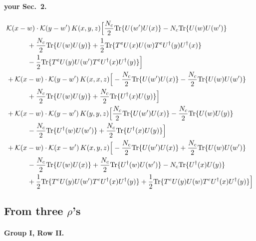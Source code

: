 \documentclass[10pt]{article}
\numberwithin{equation}{section}
\begin{document}
\paragraph{your Sec.~2.}

\begin{align}
&\mathcal K(x-w)\cdot\mathcal K(y-w')\,K(x,y,z)\Big[\frac{N_c}{2}{\rm Tr}\{U(w')U(x)\}-N_c{\rm Tr}\{U(w)U(w')\}\notag\\
&\quad\quad\quad+\frac{N_c}{2}{\rm Tr}\{U(w)U(y)\}+\frac{1}{2}{\rm Tr}\{T^eU(x)U(w)T^eU^\dagger(y)U^\dagger(x)\}\notag\\
&\quad\quad\quad-\frac{1}{2}{\rm Tr}\{T^eU(y)U(w')T^eU^\dagger(x)U^\dagger(y)\}\Big]\notag\\
&+\mathcal K(x-w)\cdot\mathcal K(y-w')\,K(x,x,z)\Big[-\frac{N_c}{2}{\rm Tr}\{U(w')U(x)\}-\frac{N_c}{2}{\rm Tr}\{U(w)U(w')\}\notag\\
&\quad\quad\quad+\frac{N_c}{2}{\rm Tr}\{U(w)U(y)\}+\frac{N_c}{2}{\rm Tr}\{U^\dagger(x)U(y)\}\Big]\notag\\
&+\mathcal K(x-w)\cdot\mathcal K(y-w')\,K(y,y,z)\Big[\frac{N_c}{2}{\rm Tr}\{U(w')U(x)\}-\frac{N_c}{2}{\rm Tr}\{U(w)U(y)\}\notag\\
&\quad\quad\quad-\frac{N_c}{2}{\rm Tr}\{U^\dagger(w)U(w')\}+\frac{N_c}{2}{\rm Tr}\{U^\dagger(x)U(y)\}\Big]\notag\\
&+\mathcal K(x-w)\cdot\mathcal K(x-w')\,K(x,y,z)\Big[-\frac{N_c}{2}{\rm Tr}\{U(w')U(x)\}+\frac{N_c}{2}{\rm Tr}\{U(w)U(w')\}\notag\\
&\quad\quad\quad-\frac{N_c}{2}{\rm Tr}\{U(w)U(x)\}+\frac{N_c}{2}{\rm Tr}\{U^\dagger(w)U(w')\}-N_c{\rm Tr}\{U^\dagger(x)U(y)\}\notag\\
&\quad\quad\quad+\frac{1}{2}{\rm Tr}\{T^eU(y)U(w')T^eU^\dagger(x)U^\dagger(y)\}+\frac{1}{2}{\rm Tr}\{T^eU(y)U(w)T^eU^\dagger(x)U^\dagger(y)\}\Big]
\label{eq:list6}
\end{align}

\subsection{\texorpdfstring{From three $\rho$'s}{From three rho's}}

\paragraph{Group I, Row II.}
\end{document}
